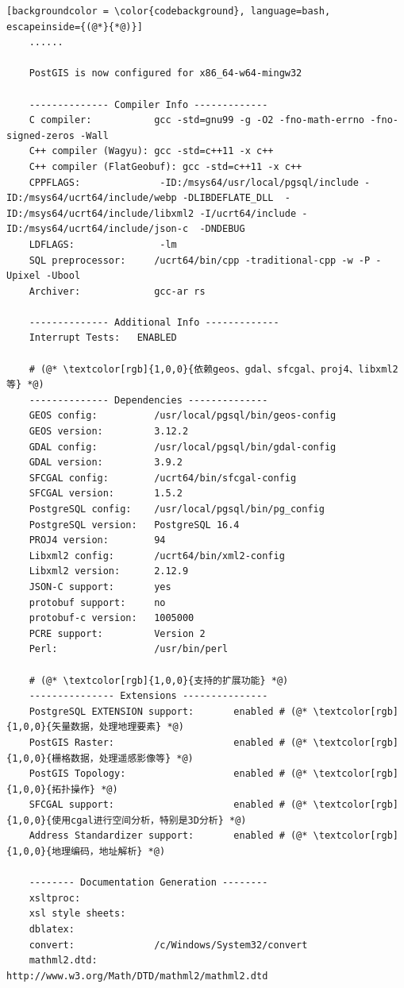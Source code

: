\begin{lstlisting}[backgroundcolor = \color{codebackground}, language=bash, escapeinside={(@*}{*@)}]
	......
	
	PostGIS is now configured for x86_64-w64-mingw32
	
	-------------- Compiler Info -------------
	C compiler:           gcc -std=gnu99 -g -O2 -fno-math-errno -fno-signed-zeros -Wall
	C++ compiler (Wagyu): gcc -std=c++11 -x c++
	C++ compiler (FlatGeobuf): gcc -std=c++11 -x c++
	CPPFLAGS:              -ID:/msys64/usr/local/pgsql/include -ID:/msys64/ucrt64/include/webp -DLIBDEFLATE_DLL  -ID:/msys64/ucrt64/include/libxml2 -I/ucrt64/include -ID:/msys64/ucrt64/include/json-c  -DNDEBUG
	LDFLAGS:               -lm
	SQL preprocessor:     /ucrt64/bin/cpp -traditional-cpp -w -P -Upixel -Ubool
	Archiver:             gcc-ar rs
	
	-------------- Additional Info -------------
	Interrupt Tests:   ENABLED
	
	# (@* \textcolor[rgb]{1,0,0}{依赖geos、gdal、sfcgal、proj4、libxml2等} *@)
	-------------- Dependencies --------------
	GEOS config:          /usr/local/pgsql/bin/geos-config
	GEOS version:         3.12.2
	GDAL config:          /usr/local/pgsql/bin/gdal-config
	GDAL version:         3.9.2
	SFCGAL config:        /ucrt64/bin/sfcgal-config
	SFCGAL version:       1.5.2
	PostgreSQL config:    /usr/local/pgsql/bin/pg_config
	PostgreSQL version:   PostgreSQL 16.4
	PROJ4 version:        94
	Libxml2 config:       /ucrt64/bin/xml2-config
	Libxml2 version:      2.12.9
	JSON-C support:       yes
	protobuf support:     no
	protobuf-c version:   1005000
	PCRE support:         Version 2
	Perl:                 /usr/bin/perl
	
	# (@* \textcolor[rgb]{1,0,0}{支持的扩展功能} *@)
	--------------- Extensions ---------------
	PostgreSQL EXTENSION support:       enabled # (@* \textcolor[rgb]{1,0,0}{矢量数据，处理地理要素} *@)
	PostGIS Raster:                     enabled # (@* \textcolor[rgb]{1,0,0}{栅格数据，处理遥感影像等} *@)
	PostGIS Topology:                   enabled # (@* \textcolor[rgb]{1,0,0}{拓扑操作} *@)
	SFCGAL support:                     enabled # (@* \textcolor[rgb]{1,0,0}{使用cgal进行空间分析，特别是3D分析} *@)
	Address Standardizer support:       enabled # (@* \textcolor[rgb]{1,0,0}{地理编码，地址解析} *@)
	
	-------- Documentation Generation --------
	xsltproc:
	xsl style sheets:
	dblatex:
	convert:              /c/Windows/System32/convert
	mathml2.dtd:          http://www.w3.org/Math/DTD/mathml2/mathml2.dtd
	
\end{lstlisting}

